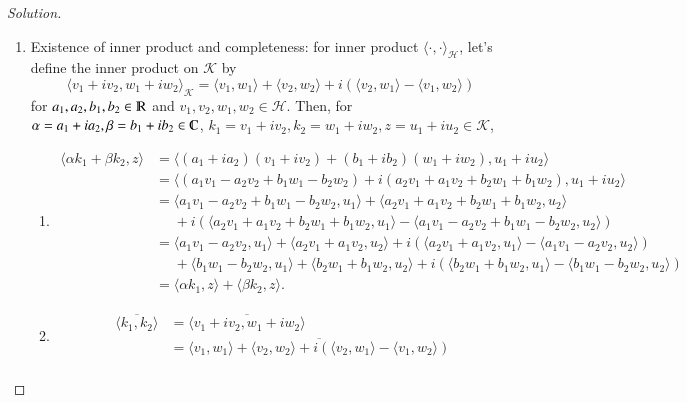 \documentclass[a4paper, 12pt]{article}
\theoremstyle{Mydefinition}
\theoremstyle{Mytheorem}
\begin{document}
\begin{proof}[Solution]
\begin{enumerate}
    \item Existence of inner product and completeness: for inner product $\langle \cdot,\cdot\rangle_{\mathscr{H}}$, let's define the inner product on $\mathscr{K}$ by
    \begin{equation}
        \langle v_1 + i v_2,w_1 + i w_2\rangle_{\mathscr{K}} = \langle v_1,w_1\rangle + \langle v_2,w_2\rangle + i\left(\langle v_2 ,w_1\rangle -\langle v_1,w_2\rangle\right)
    \end{equation}
    for $a_1,a_2,b_1,b_2\in \varmathbb{R}$ and $v_1,v_2,w_1,w_2\in \mathscr{H}$. Then, for $\alpha=a_1+ia_2, \beta=b_1+ib_2\in\varmathbb{C}$, $k_1=v_1+iv_2,k_2=w_1+iw_2, z=u_1+iu_2\in \mathscr{K}$,
    \begin{enumerate}
        \item \begin{equation}
        \begin{split}
            \langle \alpha k_1+\beta k_2, z\rangle &= \langle (a_1+ia_2)(v_1+iv_2)+ (b_1+ib_2)(w_1+iw_2), u_1+iu_2\rangle \\
            &= \langle (a_1v_1-a_2v_2+b_1w_1-b_2w_2)+i(a_2v_1+a_1v_2+b_2w_1+b_1w_2), u_1+iu_2\rangle \\
            &= \langle a_1v_1-a_2v_2+b_1w_1-b_2w_2, u_1\rangle + \langle a_2v_1+a_1v_2+b_2w_1+b_1w_2, u_2\rangle \\
            &\phantom{=} +i\left( \langle a_2v_1+a_1v_2+b_2w_1+b_1w_2, u_1\rangle -\langle a_1v_1-a_2v_2+b_1w_1-b_2w_2,u_2\rangle 
            \right) \\
            &=\langle a_1v_1-a_2v_2, u_1\rangle + \langle a_2v_1+a_1v_2, u_2\rangle +i\left( \langle a_2v_1+a_1v_2, u_1\rangle -\langle a_1v_1-a_2v_2,u_2\rangle \right)\\
            &\phantom{=} +\langle b_1w_1-b_2w_2, u_1\rangle + \langle b_2w_1+b_1w_2, u_2\rangle + i\left( \langle b_2w_1+b_1w_2, u_1\rangle -\langle b_1w_1-b_2w_2,u_2\rangle \right) \\
            &= \langle \alpha k_1, z\rangle + \langle \beta k_2,z\rangle.
        \end{split}
        \end{equation}
        \item 
        \begin{equation}
        \begin{split}
            \overline{\langle k_1,k_2\rangle} &= \overline{\langle v_1+iv_2, w_1+iw_2\rangle} \\
            &=\overline{\langle v_1,w_1\rangle + \langle v_2,w_2\rangle + i\left(\langle v_2 ,w_1\rangle -\langle v_1,w_2\rangle\right)} \\

\end{split}
\end{equation}
\end{enumerate}
\end{enumerate}
\end{proof}
\end{document}
